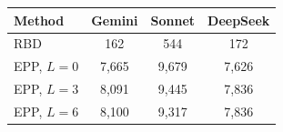 \begin{tabular}{lccc}
\toprule
Method & Gemini & Sonnet & DeepSeek\\
\midrule
RBD & 162 & 544 & 172\\
EPP, $L=0$ & 7,665 & 9,679 & 7,626\\
EPP, $L=3$ & 8,091 & 9,445 & 7,836\\
EPP, $L=6$ & 8,100 & 9,317 & 7,836\\
\bottomrule
\end{tabular}

